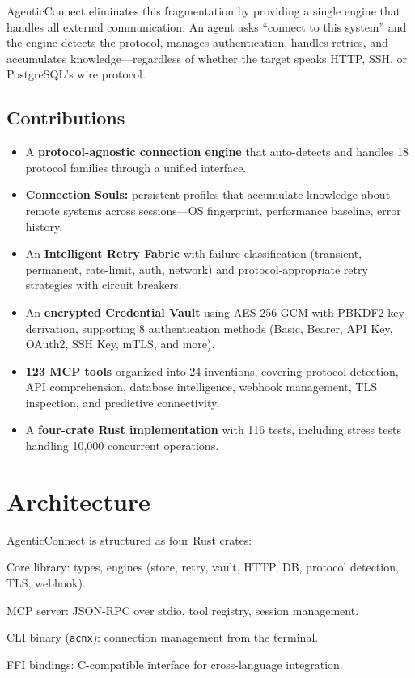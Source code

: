 \documentclass[10pt,twocolumn]{article}
\begin{document}
AgenticConnect eliminates this fragmentation by providing a single engine that handles all external communication. An agent asks ``connect to this system'' and the engine detects the protocol, manages authentication, handles retries, and accumulates knowledge—regardless of whether the target speaks HTTP, SSH, or PostgreSQL's wire protocol.

\subsection{Contributions}

\begin{itemize}[leftmargin=*]
    \item A \textbf{protocol-agnostic connection engine} that auto-detects and handles 18 protocol families through a unified interface.
    \item \textbf{Connection Souls:} persistent profiles that accumulate knowledge about remote systems across sessions—OS fingerprint, performance baseline, error history.
    \item An \textbf{Intelligent Retry Fabric} with failure classification (transient, permanent, rate-limit, auth, network) and protocol-appropriate retry strategies with circuit breakers.
    \item An \textbf{encrypted Credential Vault} using AES-256-GCM with PBKDF2 key derivation, supporting 8 authentication methods (Basic, Bearer, API Key, OAuth2, SSH Key, mTLS, and more).
    \item \textbf{123 MCP tools} organized into 24 inventions, covering protocol detection, API comprehension, database intelligence, webhook management, TLS inspection, and predictive connectivity.
    \item A \textbf{four-crate Rust implementation} with 116 tests, including stress tests handling 10,000 concurrent operations.
\end{itemize}

\section{Architecture}

AgenticConnect is structured as four Rust crates:

\begin{description}[leftmargin=*]
    \item[\texttt{agentic-connect}] Core library: types, engines (store, retry, vault, HTTP, DB, protocol detection, TLS, webhook).
    \item[\texttt{agentic-connect-mcp}] MCP server: JSON-RPC over stdio, tool registry, session management.
    \item[\texttt{agentic-connect-cli}] CLI binary (\texttt{acnx}): connection management from the terminal.
    \item[\texttt{agentic-connect-ffi}] FFI bindings: C-compatible interface for cross-language integration.
\end{description}
\end{document}

